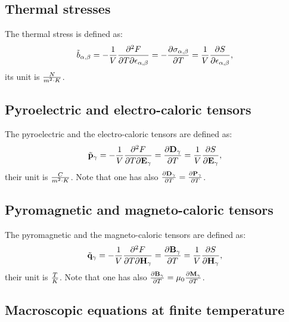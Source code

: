 \documentclass[12pt,a4paper]{article}
\begin{document}
\subsection{Thermal stresses}
The thermal stress is defined as:
\begin{equation}
\tilde b_{\alpha,\beta} = 
-{1\over V} {\partial^2 F \over \partial T
\partial \epsilon_{\alpha,\beta}}=
-{\partial \sigma_{\alpha,\beta} \over \partial T}=
{1\over V} {\partial S \over \partial {\bf \epsilon}_{\alpha,\beta}},
\end{equation}
its unit is ${N \over m^2 \cdot K}$.

\subsection{Pyroelectric and electro-caloric tensors}
The pyroelectric and the electro-caloric tensors are defined as:
\begin{equation}
\tilde {\bf p}_\gamma =
-{1\over V} {\partial^2 F \over \partial T
\partial {\bf E}_\gamma}=
{\partial {\bf D}_\gamma \over \partial T}=
{1\over V} {\partial S \over \partial {\bf E}_{\gamma}},
\end{equation}
their unit is ${C \over m^2 \cdot K}$. Note that one has also
${\partial {\bf D}_\gamma \over \partial T}=
{\partial {\bf P}_\gamma \over \partial T}$. 

\subsection{Pyromagnetic and magneto-caloric tensors}
The pyromagnetic and the magneto-caloric tensors are defined as:
\begin{equation}
\tilde {\bf q}_\gamma = 
-{1\over V} {\partial^2 F \over \partial T
\partial {\bf H}_\gamma}=
{\partial {\bf B}_\gamma \over \partial T}=
{1\over V} {\partial S \over \partial {\bf H}_{\gamma}},
\end{equation}
their unit is ${T \over K}$. Note that one has also
${\partial {\bf B}_\gamma \over \partial T}= \mu_0
{\partial {\bf M}_\gamma \over \partial T}$.

\subsection{Macroscopic equations at finite temperature}
\end{document}
